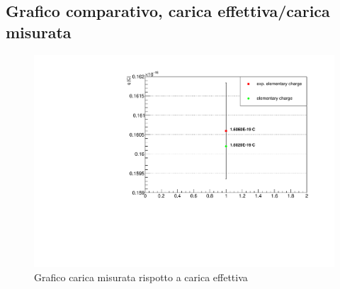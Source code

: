 \subsection{Grafico comparativo, carica effettiva/carica misurata}
\begin{figure}[H]
    \centering
    \includegraphics[width=\textwidth,height=\textheight,keepaspectratio]{graph2.pdf}
    \caption{Grafico carica misurata rispotto a carica effettiva}
\end{figure}